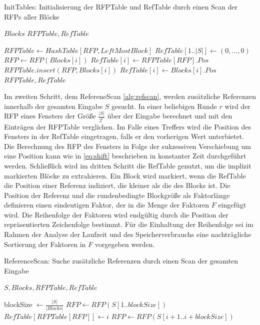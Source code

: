 \begin{algorithm}[ht]
    \centering
    \caption{InitTables: Initialisierung der RFPTable und RefTable durch einen Scan der RFPs aller Blöcke} \label{alg:inittables}
    \algorithmicrequire $Blocks$
    \algorithmicensure $RFPTable, RefTable$
    \begin{algorithmic}[1]
        \STATE $RFPTable \gets HashTable[RFP, LeftMostBlock]$
        \STATE $RefTable[1..|S|] \gets (0,...,0)$
            \STATE $RFP \gets RFP(Blocks[i])$
                \STATE $RefTable[i] \gets RFPTable[RFP].Pos$
            \ELSE
                \STATE $RFPTable.insert(RFP,Blocks[i])$
                \STATE $RefTable[i] \gets Blocks[i].Pos$
            \ENDIF
        \ENDFOR
        \RETURN $RFPTable, RefTable$
    \end{algorithmic}
\end{algorithm}

Im zweiten Schritt, dem RefereneScan \ref{alg:refscan}, werden zusätzliche Referenzen innerhalb der gesamten Eingabe $S$ gesucht. In einer beliebigen Runde $r$ wird der RFP eines Fensters der Größe $\frac{|S|}{2^r}$ 
über der Eingabe berechnet und mit den Einträgen der RFPTable verglichen. Im Falle eines Treffers wird die Position des Fensters in der RefTable eingetragen, falls er den vorherigen Wert unterbietet. Die Berechnung
des RFP des Fensters in Folge der sukzessiven Verschiebung um eine Position kann wie in \ref{eq:shift} beschrieben in konstanter Zeit durchgeführt werden.
Schließlich wird im dritten Schritt die RefTable genutzt, um die implizit markierten Blöcke zu extrahieren. Ein Block wird markiert, wenn die RefTable die Position einer Referenz indiziert, die kleiner als die
des Blocks ist. Die Position der Referenz und die rundenbedingte Blockgröße als Faktorlänge definieren einen eindeutigen Faktor, der in die Menge der Faktoren $F$ eingefügt wird. Die Reihenfolge der Faktoren
wird endgültig durch die Position der repräsentierten Zeichenfolge bestimmt. Für die Einhaltung der Reihenfolge sei im Rahmen der Analyse der Laufzeit und des Speicherverbrauchs eine nachträgliche Sortierung
der Faktoren in $F$ vorgegeben werden.

\begin{algorithm}[ht]
\centering
\caption{ReferenceScan: Suche zusätzliche Referenzen durch einen Scan der gesamten Eingabe} \label{alg:refscan}
\algorithmicrequire $S, Blocks, RFPTable, RefTable$
\begin{algorithmic} [1]
    \STATE blockSize $\gets \frac{|S|}{|Blocks|}$
    \STATE $RFP \gets RFP(S[1..blockSize])$
            \STATE $RefTable[RFPTable[RFP]] \gets i$
        \ENDIF
        \STATE $RFP \gets RFP(S[i+1..i+blockSize])$ 
    \ENDFOR
\end{algorithmic}
\end{algorithm}


